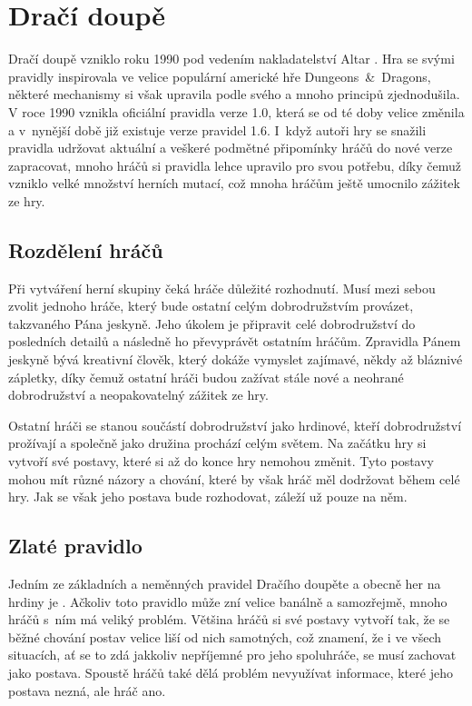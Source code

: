 \documentclass[thesis=B,czech]{resources/FITthesis}[2012/06/26]
\begin{document}
	\section{Dračí doupě}
	Dračí doupě vzniklo roku 1990 pod vedením nakladatelství Altar \cite{altar}. Hra se svými pravidly inspirovala ve velice populární americké hře Dungeons~\&~Dragons, některé mechanismy si však upravila podle svého a mnoho principů zjednodušila. V roce 1990 vznikla oficiální pravidla verze 1.0, která se od té doby velice změnila a v~nynější době již existuje verze pravidel 1.6. I~když autoři hry se snažili pravidla udržovat aktuální a veškeré podmětné připomínky hráčů do nové verze zapracovat, mnoho hráčů si pravidla lehce upravilo pro svou potřebu, díky čemuž vzniklo velké množství herních mutací, což mnoha hráčům ještě umocnilo zážitek ze hry. 
	
	\subsection{Rozdělení hráčů}
Při vytváření herní skupiny čeká hráče důležité rozhodnutí. Musí mezi sebou zvolit jednoho hráče, který bude ostatní celým dobrodružstvím provázet, takzvaného Pána jeskyně. Jeho úkolem je připravit celé dobrodružství do posledních detailů a následně ho převyprávět ostatním hráčům. Zpravidla Pánem jeskyně bývá kreativní člověk, který dokáže vymyslet zajímavé, někdy až bláznivé zápletky, díky čemuž ostatní hráči budou zažívat stále nové a neohrané dobrodružství a neopakovatelný zážitek ze hry. \par

Ostatní hráči se stanou součástí dobrodružství jako hrdinové, kteří dobrodružství prožívají a společně jako družina prochází celým světem. Na začátku hry si vytvoří své postavy, které si až do konce hry nemohou změnit. Tyto postavy mohou mít různé názory a chování, které by však hráč měl dodržovat během celé hry. Jak se však jeho postava bude rozhodovat, záleží už pouze na něm.


	\subsection{Zlaté pravidlo}
Jedním ze základních a neměnných pravidel Dračího doupěte a obecně her na hrdiny je . Ačkoliv toto pravidlo může zní velice banálně a samozřejmě, mnoho hráčů s~ním má veliký problém. Většina hráčů si své postavy vytvoří tak, že se běžné chování postav velice liší od nich samotných, což znamení, že i ve všech situacích, ať se to zdá jakkoliv nepříjemné pro jeho spoluhráče, se musí zachovat jako postava. Spoustě hráčů také dělá problém nevyužívat informace, které jeho postava nezná, ale hráč ano. \par
\end{document}
